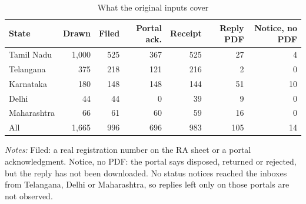 \begin{table}[!htbp]
\centering
\caption{What the original inputs cover}
\label{tab:tab_audit}
\small
\begin{threeparttable}
\begin{tabular}{lrrrrrr}
\toprule
State & Drawn & Filed & Portal ack. & Receipt & Reply PDF & Notice, no PDF \\
\midrule
Tamil Nadu & 1,000 & 525 & 367 & 525 & 27 & 4 \\
Telangana & 375 & 218 & 121 & 216 & 2 & 0 \\
Karnataka & 180 & 148 & 148 & 144 & 51 & 10 \\
Delhi & 44 & 44 & 0 & 39 & 9 & 0 \\
Maharashtra & 66 & 61 & 60 & 59 & 16 & 0 \\
\midrule
All & 1,665 & 996 & 696 & 983 & 105 & 14 \\
\bottomrule
\end{tabular}
\begin{tablenotes}[flushleft]\footnotesize
\item \textit{Notes:} Filed: a real registration number on the RA sheet or a portal acknowledgment. Notice, no PDF: the portal says disposed, returned or rejected, but the reply has not been downloaded. No status notices reached the inboxes from Telangana, Delhi or Maharashtra, so replies left only on those portals are not observed.
\end{tablenotes}
\end{threeparttable}
\end{table}
